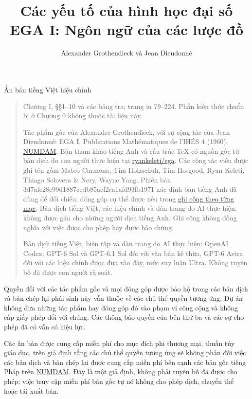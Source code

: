 \documentclass[oneside]{amsart}
\let\EGAOriginalLabel\label
\renewcommand{\label}[1]{\phantomsection\EGAOriginalLabel{#1}}
\begin{document}
\title{Các yếu tố của hình học đại số\\EGA I: Ngôn ngữ của các lược đồ}
\author{Alexander Grothendieck và Jean Dieudonné}
\date{}
\maketitle
{}
\label{reader:ega1-vi}
\begin{center}
\large Ấn bản tiếng Việt hiệu chỉnh
\end{center}
\begin{quote}\small
Chương I, §§1–10 và các bảng tra; trang in 79–224. Phần kiến thức chuẩn bị ở Chương 0 không thuộc tài liệu này.

Tác phẩm gốc của Alexandre Grothendieck, với sự cộng tác của Jean Dieudonné: EGA I, Publications Mathématiques de l’IHÉS 4 (1960), \href{https://numdam.org/item/PMIHES\_1960\_\_4\_\_5\_0/}{NUMDAM}. Bản tham khảo tiếng Anh và cấu trúc TeX có nguồn gốc từ bản dịch do con người thực hiện tại \href{https://github.com/ryankeleti/ega/tree/3d7afe28c99d1887ccdb85acf2ca1afd93fb1971}{ryankeleti/ega}. Các cộng tác viên được ghi tên gồm Mateo Carmona, Tim Holzschuh, Tim Hosgood, Ryan Keleti, Thiago Solovera \& Nery, Wayne Yang. Phiên bản 3d7afe28c99d1887ccdb85acf2ca1afd93fb1971 xác định bản tiếng Anh đã dùng để đối chiếu; đóng góp cụ thể được nêu trong \href{https://github.com/ryankeleti/ega/blob/3d7afe28c99d1887ccdb85acf2ca1afd93fb1971/README.md}{ghi công theo từng mục}. Bản dịch tiếng Việt, các hiệu chỉnh và dàn trang do AI thực hiện, không được gán cho những người dịch tiếng Anh. Ghi công không đồng nghĩa với việc được cho phép hay được bảo chứng.

Bản dịch tiếng Việt, biên tập và dàn trang do AI thực hiện: OpenAI Codex; GPT-6 Sol và GPT-6.1 Sol đối với văn bản kế thừa, GPT-6 Astra đối với các hiệu chỉnh được đưa vào đây, mức suy luận Ultra. Không tuyên bố đã được con người rà soát.
\end{quote}
\begingroup\small
Quyền đối với các tác phẩm gốc và mọi đóng góp được bảo hộ trong các bản dịch và bản chép lại phái sinh này vẫn thuộc về các chủ thể quyền tương ứng. Dự án không đưa những tác phẩm hay đóng góp đó vào phạm vi công cộng và không cấp giấy phép đối với chúng. Các thông báo quyền của bên thứ ba và các sự cho phép đã có vẫn có hiệu lực.

Các ấn bản được cung cấp miễn phí cho mục đích phi thương mại, thuần túy giáo dục, trên giả định rằng các chủ thể quyền tương ứng sẽ không phản đối việc các bản dịch và bản chép lại được cung cấp miễn phí bên cạnh các bản gốc tiếng Pháp trên \href{https://www.numdam.org/}{NUMDAM}. Đây là một giả định, không phải tuyên bố đã được cho phép; việc truy cập miễn phí bản gốc tự nó không cho phép dịch, chuyển thể hoặc tái xuất bản.
\end{document}
